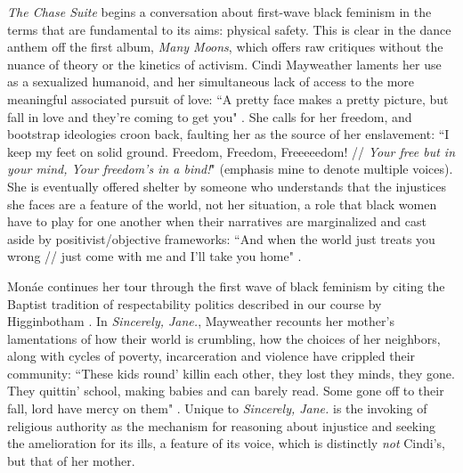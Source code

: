 \documentclass[a4paper, 11pt]{article} %
\begin{document}
\emph{The Chase Suite} begins a conversation about first-wave black feminism in the terms that are fundamental to its aims: physical safety.
This is clear in the dance anthem off the first album, \emph{Many Moons}, which offers raw critiques without the nuance of theory or the kinetics of activism.
Cindi Mayweather laments her use as a sexualized humanoid, and her simultaneous lack of access to the more meaningful associated pursuit of love: ``A pretty face makes a pretty picture, but fall in love and they're coming to get you" \cite{happyhunting}.
She calls for her freedom, and bootstrap ideologies croon back, faulting her as the source of her enslavement: ``I keep my feet on solid ground. Freedom, Freedom, Freeeeedom! // \emph{Your free but in your mind, Your freedom's in a bind!}" \cite{manymoons} (emphasis mine to denote multiple voices).
She is eventually offered shelter by someone who understands that the injustices she faces are a feature of the world, not her situation, a role that black women have to play for one another when their narratives are marginalized and cast aside by positivist/objective frameworks:
``And when the world just treats you wrong // just come with me and I'll take you home" \cite{manymoons}.

Mon\'ae continues her tour through the first wave of black feminism by citing the Baptist tradition of respectability politics described in our course by Higginbotham \cite{higginbotham}.
In \emph{Sincerely, Jane.}, Mayweather recounts her mother's lamentations of how their world is crumbling, how the choices of her neighbors, along with cycles of poverty, incarceration and violence have crippled their community:
``These kids round' killin each other, they lost they minds, they gone. They quittin' school, making babies and can barely read. Some gone off to their fall, lord have mercy on them" \cite{sincerelyjane}. 
Unique to \emph{Sincerely, Jane.} is the invoking of religious authority as the mechanism for reasoning about injustice and seeking the amelioration for its ills, a feature of its voice, which is distinctly \emph{not} Cindi's, but that of her mother.
\end{document}
